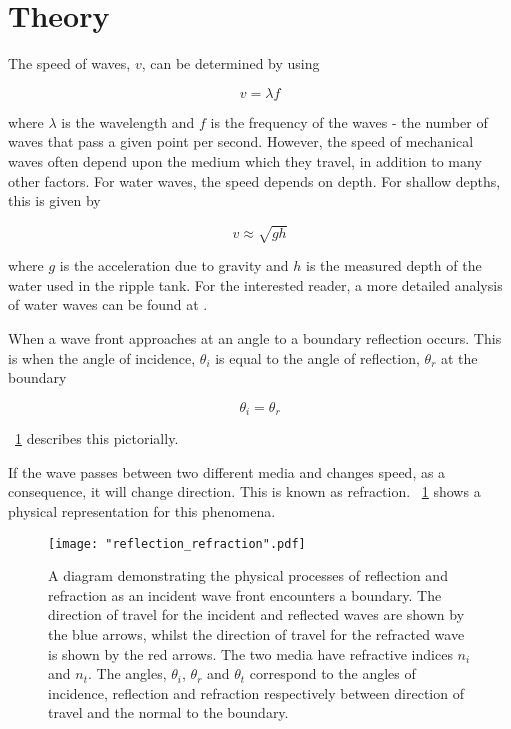 \documentclass{article}
\newcommand{\figref}[2][\figurename~]{#1\ref{#2}}
\begin{document}
\section{Theory}
\label{sec:theory}

The speed of waves, $v$, can be determined by using 

\begin{equation}
\label{eq:wave-speed}
v = \lambda f
\end{equation}

\vspace{2mm}
\noindent
where $\lambda$ is the wavelength and $f$ is the frequency of the waves - the number of waves that pass a given point per second. However, the speed of mechanical waves often depend upon the medium which they travel, in addition to many other factors. For water waves, the speed depends on depth. For shallow depths, this is given by \cite{Book02}

\begin{equation}
\label{eq:water-waves}
v \approx \sqrt{gh}
\end{equation}

\vspace{2mm}
\noindent
where $g$ is the acceleration due to gravity and $h$ is the measured depth of the water used in the ripple tank. For the interested reader, a more detailed analysis of water waves can be found at \cite{Book02}. 

\vspace{2mm}
\noindent
When a wave front approaches at an angle to a boundary reflection occurs. This is when the angle of incidence, $\theta_i$ is equal to the angle of reflection, $\theta_r$ at the boundary

\begin{equation}
\label{eq:reflection}
\theta_i = \theta_r
\end{equation}

\vspace{2mm}
\noindent
\figref{fig:reflection_refraction} describes this pictorially.

\vspace{2mm}
\noindent
If the wave passes between two different media and changes speed, as a consequence, it will change direction. This is known as refraction. \figref{fig:reflection_refraction} shows a physical representation for this phenomena.

\begin{figure}[h]
\centering
\texttt{[image: "reflection\_refraction".pdf]}
\caption{A diagram demonstrating the physical processes of reflection and refraction as an incident wave front encounters a boundary. The direction of travel for the incident and reflected waves are shown by the blue arrows, whilst the direction of travel for the refracted wave is shown by the red arrows. The two media have refractive indices $n_i$ and $n_t$. The angles, $\theta_i$, $\theta_r$ and $\theta_t$ correspond to the angles of incidence, reflection and refraction respectively between direction of travel and the normal to the boundary.}
\label{fig:reflection_refraction}
\end{figure}
\end{document}
